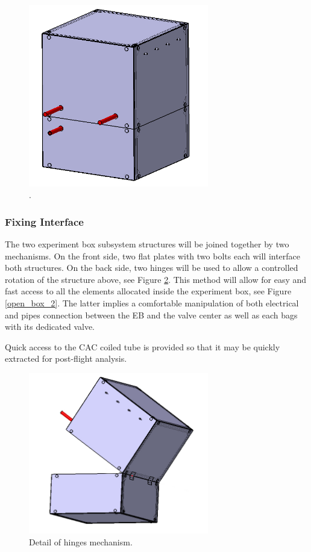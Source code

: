 \begin{figure}[!ht]
    \centering
    \includegraphics[width=0.7\textwidth]{4-experiment-design/img/frontal_holes.jpg}
    \caption{.}
    \label{front_wall_holes}
\end{figure}


\subsubsection{Fixing Interface}

The two experiment box subsystem structures will be joined together by two mechanisms. On the front side, two flat plates with two bolts each will interface both structures. On the back side, two hinges will be used to allow a controlled rotation of the structure above, see Figure \ref{open_box_1}. This method will allow for easy and fast access to all the elements allocated inside the experiment box, see Figure \ref{open_box_2}. The latter implies a comfortable manipulation of both electrical and pipes connection between the EB and the valve center as well as each bags with its dedicated valve. 

Quick access to the CAC coiled tube is provided so that it may be quickly extracted for post-flight analysis.


\begin{figure}[!ht]
    \centering
    \includegraphics[width=0.7\textwidth]{4-experiment-design/img/hinges.jpg}
    \caption{Detail of hinges mechanism.}
    \label{open_box_1}
\end{figure}

